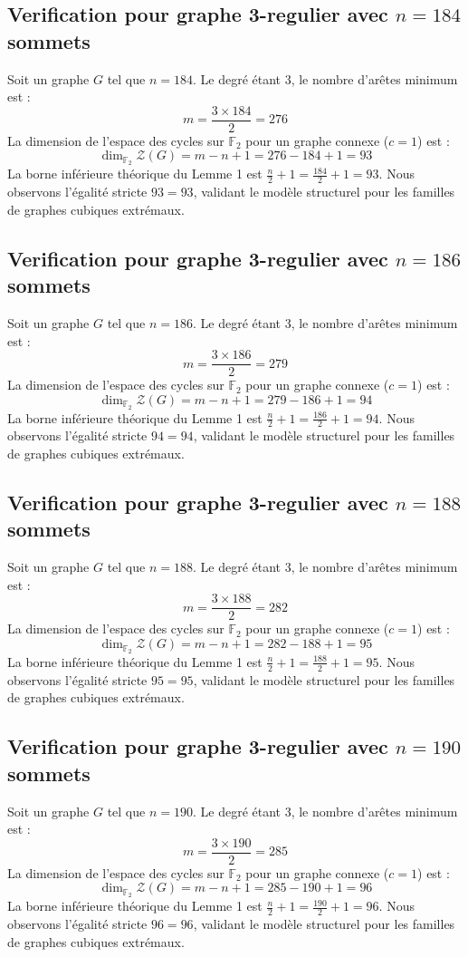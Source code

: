 \documentclass[11pt,a4paper]{article}
\begin{document}
\subsection{Verification pour graphe 3-regulier avec $n=184$ sommets}
Soit un graphe $G$ tel que $n = 184$. Le degré étant 3, le nombre d'arêtes minimum est :
$$ m = \frac{3 \times 184}{2} = 276 $$
La dimension de l'espace des cycles sur $\mathbb{F}_2$ pour un graphe connexe ($c=1$) est :
$$ \dim_{\mathbb{F}_2} \mathcal{Z}(G) = m - n + 1 = 276 - 184 + 1 = 93 $$
La borne inférieure théorique du Lemme 1 est $\frac{n}{2} + 1 = \frac{184}{2} + 1 = 93$.
Nous observons l'égalité stricte $93 = 93$, validant le modèle structurel pour les familles de graphes cubiques extrémaux.

\subsection{Verification pour graphe 3-regulier avec $n=186$ sommets}
Soit un graphe $G$ tel que $n = 186$. Le degré étant 3, le nombre d'arêtes minimum est :
$$ m = \frac{3 \times 186}{2} = 279 $$
La dimension de l'espace des cycles sur $\mathbb{F}_2$ pour un graphe connexe ($c=1$) est :
$$ \dim_{\mathbb{F}_2} \mathcal{Z}(G) = m - n + 1 = 279 - 186 + 1 = 94 $$
La borne inférieure théorique du Lemme 1 est $\frac{n}{2} + 1 = \frac{186}{2} + 1 = 94$.
Nous observons l'égalité stricte $94 = 94$, validant le modèle structurel pour les familles de graphes cubiques extrémaux.

\subsection{Verification pour graphe 3-regulier avec $n=188$ sommets}
Soit un graphe $G$ tel que $n = 188$. Le degré étant 3, le nombre d'arêtes minimum est :
$$ m = \frac{3 \times 188}{2} = 282 $$
La dimension de l'espace des cycles sur $\mathbb{F}_2$ pour un graphe connexe ($c=1$) est :
$$ \dim_{\mathbb{F}_2} \mathcal{Z}(G) = m - n + 1 = 282 - 188 + 1 = 95 $$
La borne inférieure théorique du Lemme 1 est $\frac{n}{2} + 1 = \frac{188}{2} + 1 = 95$.
Nous observons l'égalité stricte $95 = 95$, validant le modèle structurel pour les familles de graphes cubiques extrémaux.

\subsection{Verification pour graphe 3-regulier avec $n=190$ sommets}
Soit un graphe $G$ tel que $n = 190$. Le degré étant 3, le nombre d'arêtes minimum est :
$$ m = \frac{3 \times 190}{2} = 285 $$
La dimension de l'espace des cycles sur $\mathbb{F}_2$ pour un graphe connexe ($c=1$) est :
$$ \dim_{\mathbb{F}_2} \mathcal{Z}(G) = m - n + 1 = 285 - 190 + 1 = 96 $$
La borne inférieure théorique du Lemme 1 est $\frac{n}{2} + 1 = \frac{190}{2} + 1 = 96$.
Nous observons l'égalité stricte $96 = 96$, validant le modèle structurel pour les familles de graphes cubiques extrémaux.
\end{document}
